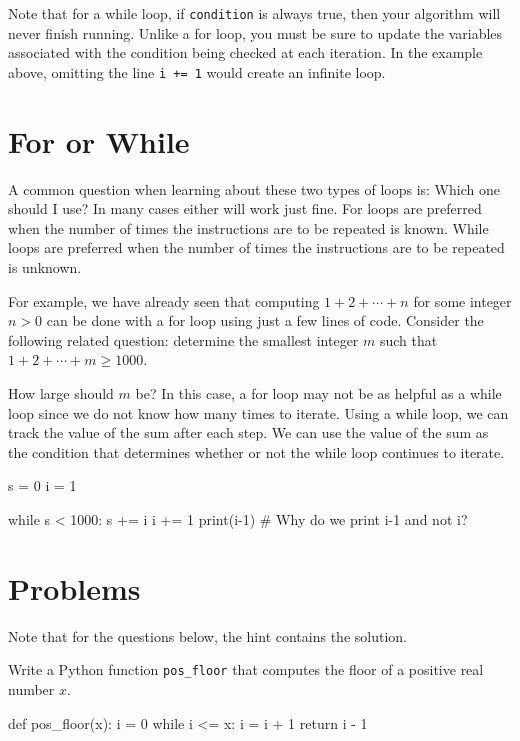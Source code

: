 \documentclass{ximera}
\begin{document}
Note that for a while loop, if \verb|condition| is always true, then your algorithm will never finish running. Unlike a for loop, you must be sure to update the variables associated with the condition being checked at each iteration. In the example above, omitting the line \verb|i += 1| would create an infinite loop.

\section{For or While}

A common question when learning about these two types of loops is: Which one should I use? In many cases either will work just fine. For loops are preferred when the number of times the instructions are to be repeated is known. While loops are preferred when the number of times the instructions are to be repeated is unknown.

For example, we have already seen that computing $1+2+\cdots+n$ for some integer $n>0$ can be done with a for loop using just a few lines of code. Consider the following related question: determine the smallest integer $m$ such that $1+2+\cdots+m\geq 1000$.

How large should $m$ be? In this case, a for loop may not be as helpful as a while loop since we do not know how many times to iterate. Using a while loop, we can track the value of the sum after each step. We can use the value of the sum as the condition that determines whether or not the while loop continues to iterate. 

\begin{sageCell}
s = 0
i = 1

while s < 1000:
        s += i
        i += 1
print(i-1)  # Why do we print i-1 and not i?
\end{sageCell}

\section{Problems}

Note that for the questions below, the hint contains the solution.

\begin{question}
	Write a Python function \verb|pos_floor| that computes the floor of a positive real number $x$.
\begin{hint}
\begin{sageCell}
def pos_floor(x):
        i = 0
        while i <= x:
                i = i + 1
        return i - 1
\end{sageCell}
\end{hint}
\end{question}
\end{document}
